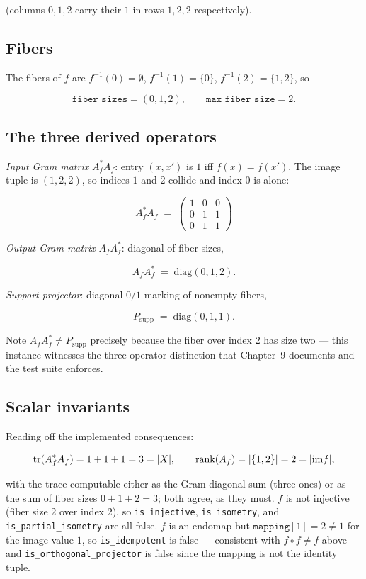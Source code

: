(columns $0,1,2$ carry their $1$ in rows $1, 2, 2$ respectively).

\subsection{Fibers}

The fibers of $f$ are $f^{-1}(0) = \emptyset$, $f^{-1}(1) = \{0\}$,
$f^{-1}(2) = \{1, 2\}$, so

\[
\texttt{fiber\_sizes} = (0, 1, 2), \qquad
\texttt{max\_fiber\_size} = 2 .
\]

\subsection{The three derived operators}

\emph{Input Gram matrix} $A_f^{*} A_f$: entry $(x, x')$ is $1$ iff
$f(x) = f(x')$. The image tuple is $(1, 2, 2)$, so indices $1$ and $2$
collide and index $0$ is alone:

\[
A_f^{*} A_f \;=\;
\begin{pmatrix}
1 & 0 & 0 \\
0 & 1 & 1 \\
0 & 1 & 1
\end{pmatrix}
\]

\emph{Output Gram matrix} $A_f A_f^{*}$: diagonal of fiber sizes,

\[
A_f A_f^{*} \;=\; \mathrm{diag}(0, 1, 2) .
\]

\emph{Support projector}: diagonal $0/1$ marking of nonempty fibers,

\[
P_{\mathrm{supp}} \;=\; \mathrm{diag}(0, 1, 1) .
\]

Note $A_f A_f^{*} \ne P_{\mathrm{supp}}$ precisely because the fiber
over index $2$ has size two --- this instance witnesses the
three-operator distinction that Chapter~9 documents and the test suite
enforces.

\subsection{Scalar invariants}

Reading off the implemented consequences:

\[
\mathrm{tr}(A_f^{*} A_f) = 1 + 1 + 1 = 3 = |X|, \qquad
\mathrm{rank}(A_f) = |\{1, 2\}| = 2 = |\mathrm{im} f| ,
\]

with the trace computable either as the Gram diagonal sum (three ones)
or as the sum of fiber sizes $0 + 1 + 2 = 3$; both agree, as they
must. $f$ is not injective (fiber size $2$ over index $2$), so
\texttt{is\_injective}, \texttt{is\_isometry}, and
\texttt{is\_partial\_isometry} are all false. $f$ is an endomap but
$\texttt{mapping}[1] = 2 \ne 1$ for the image value $1$, so
\texttt{is\_idempotent} is false --- consistent with
$f \circ f \ne f$ above --- and \texttt{is\_orthogonal\_projector} is
false since the mapping is not the identity tuple.


